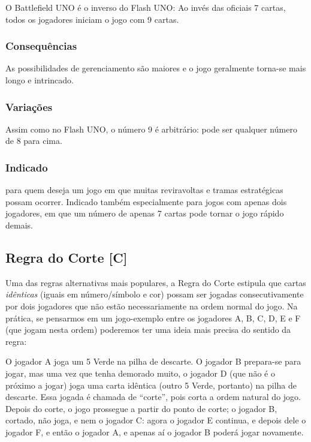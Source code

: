 O Battlefield UNO é o inverso do Flash UNO: Ao invés das oficiais 7 cartas, todos os jogadores iniciam o jogo com 9 cartas.

\subsubsection{Consequências}

As possibilidades de gerenciamento são maiores e o jogo geralmente torna-se mais longo e intrincado.

\subsubsection{Variações}

Assim como no Flash UNO, o número 9 é arbitrário: pode ser qualquer número de 8 para cima.

\subsubsection{Indicado}

para quem deseja um jogo em que muitas reviravoltas e tramas estratégicas possam ocorrer. Indicado também especialmente para jogos com apenas dois jogadores, em que um número de apenas 7 cartas pode tornar o jogo rápido demais.

\subsection{Regra do Corte [C]}

\label{regradocorte}

Uma das regras alternativas mais populares, a Regra do Corte estipula que cartas \emph{idênticas} (iguais em número/símbolo e cor) possam ser jogadas consecutivamente por dois jogadores que não estão necessariamente na ordem normal do jogo. Na prática, se pensarmos em um jogo-exemplo entre os jogadores A, B, C, D, E e F (que jogam nesta ordem) poderemos ter uma ideia mais precisa do sentido da regra:

O jogador A joga um 5 Verde na pilha de descarte. O jogador B prepara-se para jogar, mas uma vez que tenha demorado muito, o jogador D (que não é o próximo a jogar) joga uma carta idêntica (outro 5 Verde, portanto) na pilha de descarte. Essa jogada é chamada de ``corte'', pois corta a ordem natural do jogo. Depois do corte, o jogo prossegue a partir do ponto de corte; o jogador B, cortado, não joga, e nem o jogador C: agora o jogador E continua, e depois dele o jogador F, e então o jogador A, e apenas aí o jogador B poderá jogar novamente.

